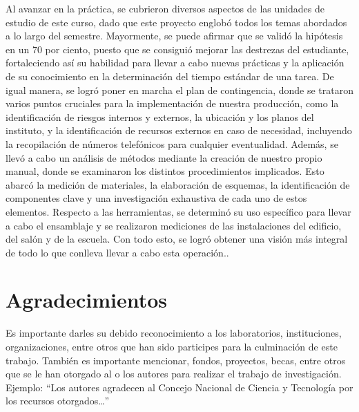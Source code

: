     Al avanzar en la práctica, se cubrieron diversos aspectos de las unidades de estudio de este curso, dado que este proyecto englobó todos los temas abordados a lo largo del semestre. Mayormente, se puede afirmar que se validó la hipótesis en un 70 por ciento, puesto que se consiguió mejorar las destrezas del estudiante, fortaleciendo así su habilidad para llevar a cabo nuevas prácticas y la aplicación de su conocimiento en la determinación del tiempo estándar de una tarea. De igual manera, se logró poner en marcha el plan de contingencia, donde se trataron varios puntos cruciales para la implementación de nuestra producción, como la identificación de riesgos internos y externos, la ubicación y los planos del instituto, y la identificación de recursos externos en caso de necesidad, incluyendo la recopilación de números telefónicos para cualquier eventualidad. Además, se llevó a cabo un análisis de métodos mediante la creación de nuestro propio manual, donde se examinaron los distintos procedimientos implicados. Esto abarcó la medición de materiales, la elaboración de esquemas, la identificación de componentes clave y una investigación exhaustiva de cada uno de estos elementos. Respecto a las herramientas, se determinó su uso específico para llevar a cabo el ensamblaje y se realizaron mediciones de las instalaciones del edificio, del salón y de la escuela. Con todo esto, se logró obtener una visión más integral de todo lo que conlleva llevar a cabo esta operación..
    
    \section{Agradecimientos}
    
    Es importante darles su debido reconocimiento a los laboratorios, instituciones, organizaciones, entre otros que han sido participes para la culminación de este trabajo. También es importante mencionar, fondos, proyectos, becas, entre otros que se le han otorgado al o los autores para realizar el trabajo de investigación. Ejemplo: “Los autores agradecen al Concejo Nacional de Ciencia y Tecnología por los recursos otorgados…”
    
    
